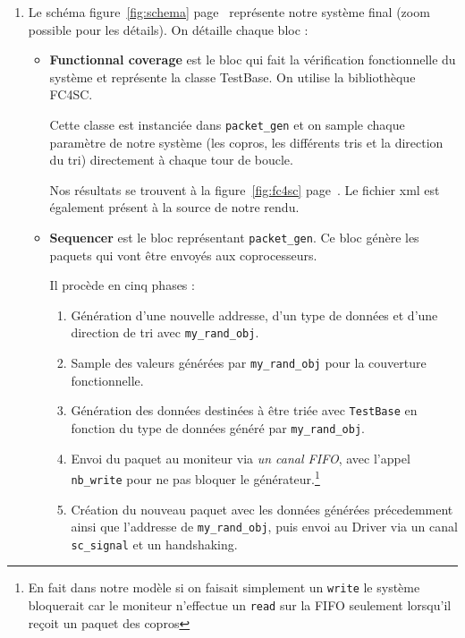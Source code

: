 \documentclass[a4paper, 10pt]{article}
\begin{document}
\begin{enumerate}
	\item Le schéma figure~\ref{fig:schema} page~\pageref{fig:schema} représente notre
		système final (zoom possible pour les détails). On détaille chaque bloc :
		\begin{itemize}
			\item \textbf{Functionnal coverage} est le bloc qui fait la vérification fonctionnelle
				du système et représente la classe TestBase. On utilise la bibliothèque FC4SC.
				
				Cette classe est instanciée dans \texttt{packet\_gen} et on sample chaque
				paramètre de notre système (les copros, les différents tris et la
				direction du tri) directement à chaque tour de boucle.

				Nos résultats se trouvent à la figure~\ref{fig:fc4sc}
				page~\pageref{fig:fc4sc}. Le fichier xml est également présent à la source
				de notre rendu.

			\item \textbf{Sequencer} est le bloc représentant \texttt{packet\_gen}. Ce bloc génère
				les paquets qui vont être envoyés aux coprocesseurs.

				Il procède en cinq phases :
				\begin{enumerate}
					\item Génération d'une nouvelle addresse, d'un type de données et d'une
						direction de tri avec \texttt{my\_rand\_obj}.
					\item Sample des valeurs générées par \texttt{my\_rand\_obj} pour la
						couverture fonctionnelle.
					\item Génération des données destinées à être triée avec \texttt{TestBase} en fonction
						du type de données généré par \texttt{my\_rand\_obj}.
					\item Envoi du paquet au moniteur via \emph{un canal FIFO}, avec l'appel
						\texttt{nb\_write} pour ne pas bloquer le générateur.\footnote{En
						fait dans notre modèle si on faisait simplement un \texttt{write}
						le système bloquerait car le moniteur n'effectue un \texttt{read}
						sur la FIFO seulement lorsqu'il reçoit un paquet des copros}
					\item Création du nouveau  paquet avec les données générées précedemment ainsi
						que l'addresse de \texttt{my\_rand\_obj}, puis envoi au Driver via un
						canal \texttt{sc\_signal} et un handshaking.
				\end{enumerate}


\end{itemize}
\end{enumerate}
\end{document}
